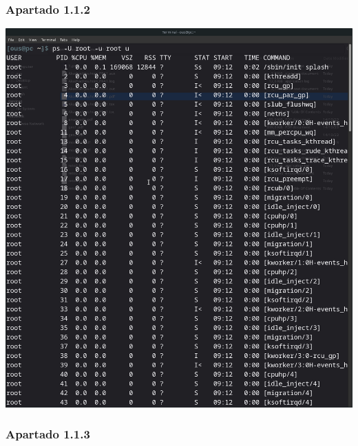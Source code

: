 \documentclass[spanish]{article}
\begin{document}
\subsubsection{Apartado 1.1.2}

\begin{center}
\includegraphics[scale=.3]{../img/2.png}
\end{center}

\newpage

\subsubsection{Apartado 1.1.3}
\end{document}

